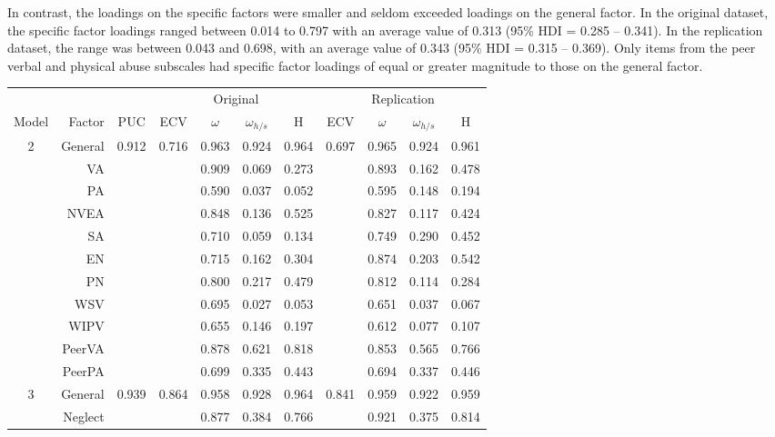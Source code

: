 \documentclass[letterpaper,man,natbib,noextraspace,floatsintext,longtable]{apa6}
\begin{document}
In contrast, the loadings on the specific factors were smaller and seldom exceeded loadings on the general factor. In the original dataset, the specific factor loadings ranged between 0.014 to 0.797 with an average value of 0.313 (95\% HDI = 0.285 -- 0.341). In the replication dataset, the range was between 0.043 and 0.698, with an average value of 0.343 (95\% HDI = 0.315 -- 0.369). Only items from the peer verbal and physical abuse subscales had specific factor loadings of equal or greater magnitude to those on the general factor. 
\begin{table}[t!]
\centering
\begin{tabular*}{\textwidth}{crccccccccc}
\toprule
& & & \multicolumn{4}{c}{Original} & \multicolumn{4}{c}{Replication} \\
\cmidrule(lr){4-7}\cmidrule(lr){8-11}
Model & Factor & PUC & ECV & $\omega$ & $\omega_{h/s}$ & H & ECV & $\omega$ & $\omega_{h/s}$ & H \\
\midrule
2 & General &  0.912 & 0.716 &  0.963 &   0.924 &  0.964 & 0.697 & 0.965 & 0.924 & 0.961 \\
& VA        &        &       &  0.909 &   0.069 &  0.273 &       & 0.893 & 0.162 & 0.478 \\
& PA        &        &       &  0.590 &   0.037 &  0.052 &       & 0.595 & 0.148 & 0.194 \\
& NVEA      &        &       &  0.848 &   0.136 &  0.525 &       & 0.827 & 0.117 & 0.424 \\
& SA        &        &       &  0.710 &   0.059 &  0.134 &       & 0.749 & 0.290 & 0.452 \\
& EN        &        &       &  0.715 &   0.162 &  0.304 &       & 0.874 & 0.203 & 0.542 \\
& PN        &        &       &  0.800 &   0.217 &  0.479 &       & 0.812 & 0.114 & 0.284 \\
& WSV       &        &       &  0.695 &   0.027 &  0.053 &       & 0.651 & 0.037 & 0.067 \\
& WIPV      &        &       &  0.655 &   0.146 &  0.197 &       & 0.612 & 0.077 & 0.107 \\
& PeerVA    &        &       &  0.878 &   0.621 &  0.818 &       & 0.853 & 0.565 & 0.766 \\
& PeerPA    &        &       &  0.699 &   0.335 &  0.443 &       & 0.694 & 0.337 & 0.446 \\
\midrule
3 & General &  0.939 & 0.864 &  0.958 &   0.928 &  0.964 & 0.841 & 0.959 & 0.922 & 0.959 \\
& Neglect   &        &       &  0.877 &   0.384 &  0.766 &       & 0.921 & 0.375 & 0.814 \\

\end{tabular*}
\end{table}
\end{document}
